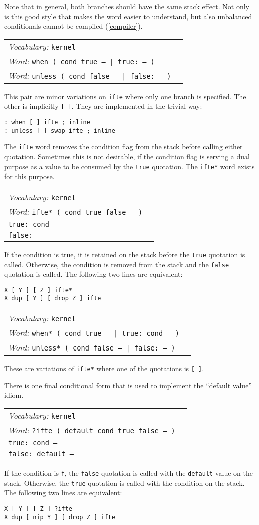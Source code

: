 \documentclass{book}
\newcommand{\vocabulary}[1]{\emph{Vocabulary:} \texttt{#1}&\\}
\newcommand{\ordinaryword}[2]{\index{\texttt{#1}}\emph{Word:} \texttt{#2}&\\}
\newcommand{\wordtable}[1]{


\begin{tabularx}{12cm}{lX}
\hline
#1
\hline
\end{tabularx}

}
\begin{document}
Note that in general, both branches should have the same stack effect. Not only is this good style that makes the word easier to understand, but also unbalanced conditionals cannot be compiled (\ref{compiler}).
\wordtable{
\vocabulary{kernel}
\ordinaryword{when}{when ( cond true -- | true:~-- )}
\ordinaryword{unless}{unless ( cond false -- | false:~-- )}
}
This pair are minor variations on \texttt{ifte} where only one branch is specified. The other is implicitly \texttt{[ ]}. They are implemented in the trivial way:
\begin{verbatim}
: when [ ] ifte ; inline
: unless [ ] swap ifte ; inline
\end{verbatim}
The \texttt{ifte} word removes the condition flag from the stack before calling either quotation. Sometimes this is not desirable, if the condition flag is serving a dual purpose as a value to be consumed by the \texttt{true} quotation. The \texttt{ifte*} word exists for this purpose.
\wordtable{
\vocabulary{kernel}
\ordinaryword{ifte*}{ifte*~( cond true false -- )}
\texttt{true:~cond --}\\
\texttt{false:~--}\\
}
If the condition is true, it is retained on the stack before the \texttt{true} quotation is called. Otherwise, the condition is removed from the stack and the \texttt{false} quotation is called. The following two lines are equivalent:
\begin{verbatim}
X [ Y ] [ Z ] ifte*
X dup [ Y ] [ drop Z ] ifte
\end{verbatim}
\wordtable{
\vocabulary{kernel}
\ordinaryword{when*}{when*~( cond true -- | true:~cond -- )}
\ordinaryword{unless*}{unless*~( cond false -- | false:~-- )}
}
These are variations of \texttt{ifte*} where one of the quotations is \texttt{[ ]}.

There is one final conditional form that is used to implement the ``default value'' idiom.
\wordtable{
\vocabulary{kernel}
\ordinaryword{?ifte}{?ifte ( default cond true false -- )}
\texttt{true:~cond --}\\
\texttt{false:~default --}\\
}
If the condition is \texttt{f}, the \texttt{false} quotation is called with the \texttt{default} value on the stack. Otherwise, the \texttt{true} quotation is called with the condition on the stack. The following two lines are equivalent:
\begin{verbatim}
X [ Y ] [ Z ] ?ifte
X dup [ nip Y ] [ drop Z ] ifte
\end{verbatim}
\end{document}
